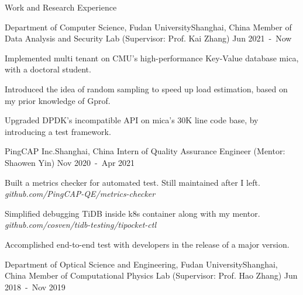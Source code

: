 \documentclass{resume} %
\begin{document}
\begin{rSection}{Work and Research Experience}



\begin{rSubsection}
{Department of Computer Science, Fudan University}{Shanghai, China}
{Member of Data Analysis and Security Lab (Supervisor: Prof. Kai Zhang)} {Jun 2021\ -\ Now}

\item Implemented multi tenant on CMU's high-performance Key-Value database mica, with a doctoral student.
\item Introduced the idea of random sampling to speed up load estimation, based on my prior knowledge of Gprof.
\item Upgraded DPDK's incompatible API on mica's 30K line code base, by introducing a test framework.

\end{rSubsection}


\begin{rSubsection}
{PingCAP Inc.}{Shanghai, China}
{Intern of Quality Assurance Engineer (Mentor: Shaowen Yin)} {Nov 2020\ -\ Apr 2021}

\item Built a metrics checker for automated test. Still maintained after I left. \hfill {\em github.com/PingCAP-QE/metrics-checker }

\item Simplified debugging TiDB inside k8s container along with my mentor. \hfill {\em github.com/cosven/tidb-testing/tipocket-ctl }

\item Accomplished end-to-end test with developers in the release of a major version.


\end{rSubsection}



\begin{rSubsection}
{Department of Optical Science and Engineering, Fudan University}{Shanghai, China}
{Member of Computational Physics Lab (Supervisor: Prof. Hao Zhang)}
{Jun 2018\ -\ Nov 2019}


\end{rSubsection}
\end{rSection}
\end{document}
